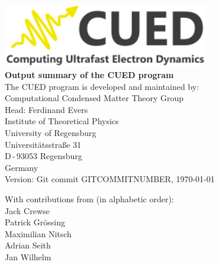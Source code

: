 \documentclass[11pt, a4paper, openany]{scrartcl}
\begin{document}

\begin{titlepage}
  \sffamily
  \begin{center}
{
\includegraphics[width=9cm]{logo.pdf}
\\[10em]
\Huge \bfseries Output summary of the CUED program}
\\[5em]\large
The CUED program is developed and maintained by:
\\[5em]
Computational Condensed Matter Theory Group
\\[0.5em]
Head: Ferdinand Evers
  \\[0.5em]
Institute of Theoretical Physics
  \\[0.5em]
University of Regensburg
  \\[0.5em]
Universitätsstraße 31
  \\[0.5em]
D\,-\,93053 Regensburg
  \\[0.5em]
Germany
\\[5em]
Version: Git commit GITCOMMITNUMBER, \today
\\[5em]
  \end{center}{\large
  With contributions from (in alphabetic order): 
  \\[1em]
  Jack Crewse
  \\[0.5em]
  Patrick Grössing
  \\[0.5em]
  Maximilian Nitsch
  \\[0.5em]
  Adrian Seith
  \\[0.5em]
  Jan Wilhelm
  }
\end{titlepage}







\pagestyle{plain}




\tableofcontents


\pagestyle{fancy}
\end{document}

